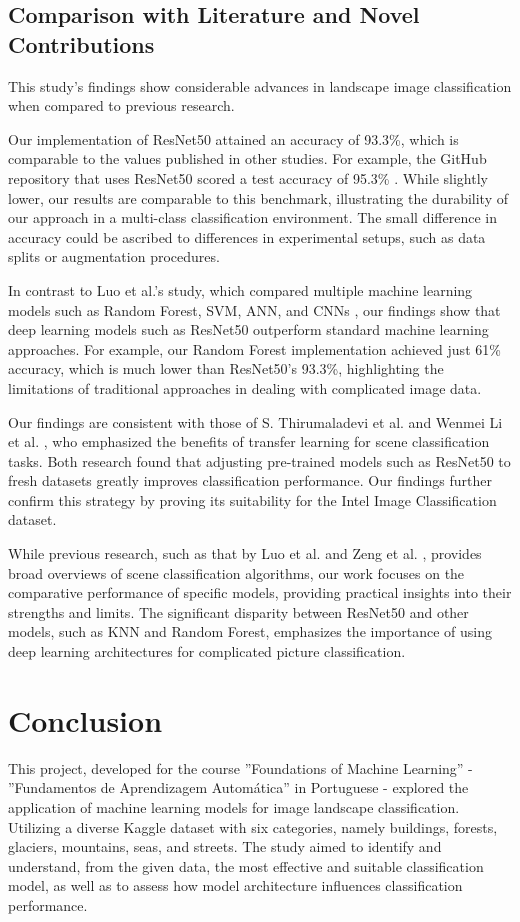 \documentclass[conference]{IEEEtran}
\begin{document}
\subsection{Comparison with Literature and Novel Contributions}
This study's findings show considerable advances in landscape image classification when compared to previous research. 

Our implementation of ResNet50 attained an accuracy of 93.3\%, which is comparable to the values published in other studies. For example, the GitHub repository that uses ResNet50 scored a test accuracy of 95.3\% \cite{githubpratim}. While slightly lower, our results are comparable to this benchmark, illustrating the durability of our approach in a multi-class classification environment. The small difference in accuracy could be ascribed to differences in experimental setups, such as data splits or augmentation procedures.

In contrast to Luo et al.'s study, which compared multiple machine learning models such as Random Forest, SVM, ANN, and CNNs \cite{luo2019}, our findings show that deep learning models such as ResNet50 outperform standard machine learning approaches. For example, our Random Forest implementation achieved just 61\% accuracy, which is much lower than ResNet50's 93.3\%, highlighting the limitations of traditional approaches in dealing with complicated image data.

Our findings are consistent with those of S. Thirumaladevi et al. \cite{Thirumaladevi} and Wenmei Li et al. \cite{Li}, who emphasized the benefits of transfer learning for scene classification tasks. Both research found that adjusting pre-trained models such as ResNet50 to fresh datasets greatly improves classification performance. Our findings further confirm this strategy by proving its suitability for the Intel Image Classification dataset.

While previous research, such as that by Luo et al. \cite{luo2019} and Zeng et al. \cite{zeng}, provides broad overviews of scene classification algorithms, our work focuses on the comparative performance of specific models, providing practical insights into their strengths and limits. The significant disparity between ResNet50 and other models, such as KNN and Random Forest, emphasizes the importance of using deep learning architectures for complicated picture classification.

\section{Conclusion}
\label{sec:concl}
This project, developed for the course ''Foundations of Machine Learning'' - ''Fundamentos de Aprendizagem Automática'' in Portuguese - explored the application of machine learning models for image landscape classification. Utilizing a diverse Kaggle dataset with six categories, namely buildings, forests, glaciers, mountains, seas, and streets. The study aimed to identify and understand, from the given data, the most effective and suitable classification model, as well as to assess how model architecture influences classification performance.
\end{document}
